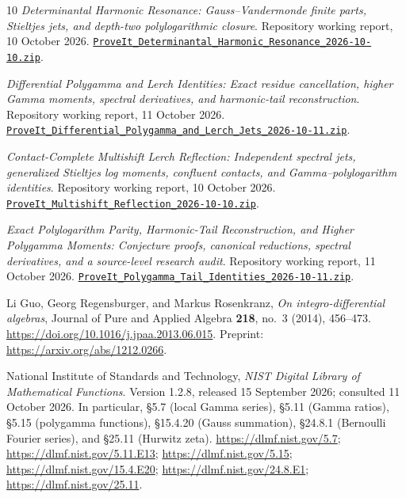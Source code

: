 \documentclass[11pt,letterpaper]{article}
\numberwithin{equation}{section}
\theoremstyle{plain}
\theoremstyle{definition}
\theoremstyle{remark}
\begin{document}
\begin{thebibliography}{10}
\emph{Determinantal Harmonic Resonance: Gauss--Vandermonde finite
parts, Stieltjes jets, and depth-two polylogarithmic closure}.
Repository working report, 10 October 2026.
\href{https://raw.githubusercontent.com/VladimirReshetnikov/ProveIt/446dca9bd65c20e409d1d2561d4ffad408103e2a/docs/incoming/ProveIt_Determinantal_Harmonic_Resonance_2026-10-10.zip}
{\nolinkurl{ProveIt_Determinantal_Harmonic_Resonance_2026-10-10.zip}}.

\emph{Differential Polygamma and Lerch Identities: Exact residue
cancellation, higher Gamma moments, spectral derivatives, and
harmonic-tail reconstruction}.
Repository working report, 11 October 2026.
\href{https://raw.githubusercontent.com/VladimirReshetnikov/ProveIt/446dca9bd65c20e409d1d2561d4ffad408103e2a/docs/incoming/ProveIt_Differential_Polygamma_and_Lerch_Jets_2026-10-11.zip}
{\nolinkurl{ProveIt_Differential_Polygamma_and_Lerch_Jets_2026-10-11.zip}}.

\emph{Contact-Complete Multishift Lerch Reflection: Independent
spectral jets, generalized Stieltjes log moments, confluent contacts,
and Gamma--polylogarithm identities}.
Repository working report, 10 October 2026.
\href{https://raw.githubusercontent.com/VladimirReshetnikov/ProveIt/446dca9bd65c20e409d1d2561d4ffad408103e2a/docs/incoming/ProveIt_Multishift_Reflection_2026-10-10.zip}
{\nolinkurl{ProveIt_Multishift_Reflection_2026-10-10.zip}}.

\emph{Exact Polylogarithm Parity, Harmonic-Tail Reconstruction,
and Higher Polygamma Moments: Conjecture proofs, canonical reductions,
spectral derivatives, and a source-level research audit}.
Repository working report, 11 October 2026.
\href{https://raw.githubusercontent.com/VladimirReshetnikov/ProveIt/446dca9bd65c20e409d1d2561d4ffad408103e2a/docs/incoming/ProveIt_Polygamma_Tail_Identities_2026-10-11.zip}
{\nolinkurl{ProveIt_Polygamma_Tail_Identities_2026-10-11.zip}}.

Li Guo, Georg Regensburger, and Markus Rosenkranz,
\emph{On integro-differential algebras},
Journal of Pure and Applied Algebra \textbf{218}, no.~3 (2014),
456--473.
\url{https://doi.org/10.1016/j.jpaa.2013.06.015}.
Preprint: \url{https://arxiv.org/abs/1212.0266}.

National Institute of Standards and Technology,
\emph{NIST Digital Library of Mathematical Functions}.
Version 1.2.8, released 15 September 2026; consulted 11 October 2026.
In particular, \S5.7 (local Gamma series), \S5.11 (Gamma ratios),
\S5.15 (polygamma functions), \S15.4.20 (Gauss summation),
\S24.8.1 (Bernoulli Fourier series), and \S25.11 (Hurwitz zeta).
\url{https://dlmf.nist.gov/5.7};
\url{https://dlmf.nist.gov/5.11.E13};
\url{https://dlmf.nist.gov/5.15};
\url{https://dlmf.nist.gov/15.4.E20};
\url{https://dlmf.nist.gov/24.8.E1};
\url{https://dlmf.nist.gov/25.11}.

\end{thebibliography}

\end{document}
